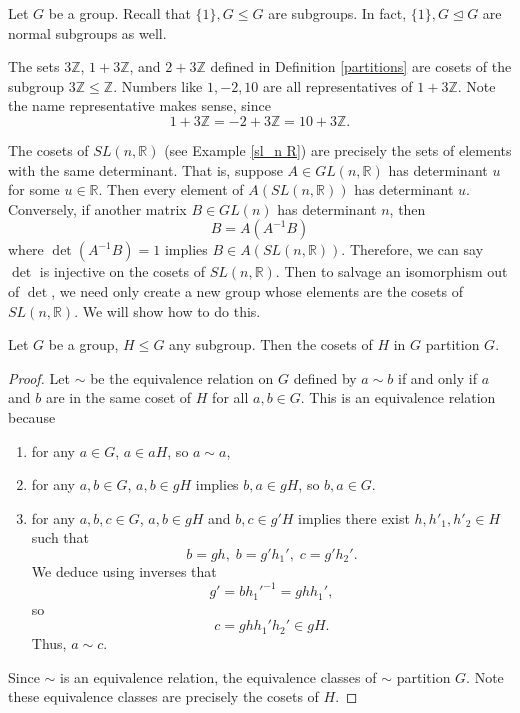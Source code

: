 \documentclass{amsart}
\begin{document}
\begin{example}\label{easy-subgroups-normal}
	Let \(G\) be a group. Recall that \(\{1\}, G\le G\) are subgroups. In fact,
	\(\{1\}, G\trianglelefteq G\) are normal subgroups as well.
\end{example}

\begin{example}\label{3z-normal}
	The sets \(3\mathbb{Z}\), \(1 + 3\mathbb{Z}\), and \(2 + 3\mathbb{Z}\)
	defined in Definition \ref{partitions} are cosets of the subgroup
	\(3\mathbb{Z}\le\mathbb{Z}\). Numbers like \(1, -2, 10\) are all
	representatives of \(1 + 3\mathbb{Z}\). Note the name representative makes
	sense, since
	\[
	   1 + 3\mathbb{Z} = -2 + 3\mathbb{Z} = 10 + 3\mathbb{Z}.
	\]
\end{example}

\begin{example}\label{det-iso}
	The cosets of \(SL(n, \mathbb{R})\) (see Example \ref{sl_n R}) are precisely
	the sets of elements with the same determinant. That is, suppose \(A\in
	GL(n, \mathbb{R})\) has determinant \(u\) for some \(u\in \mathbb{R}\). Then
	every element of \(A(SL(n, \mathbb{R}))\) has determinant \(u\). Conversely,
	if another matrix \(B\in GL(n)\) has determinant \(n\), then 
	\[
	   B = A(A^{-1}B)
	\]
	where \(\det(A^{-1}B) = 1\) implies \(B\in A(SL(n, \mathbb{R}))\).
	Therefore, we can say \(\det\) is injective on the cosets of \(SL(n,
	\mathbb{R})\). Then to salvage an isomorphism out of \(\det\), we need only
	create a new group whose elements are the cosets of \(SL(n, \mathbb{R})\).
	We will show how to do this.
\end{example}

\begin{proposition}\label{cosets-partition}
  Let \(G\) be a group, \(H\le G\) any subgroup. Then the cosets of \(H\) in
  \(G\) partition \(G\). 
\end{proposition}
\begin{proof}
   Let \(\sim\) be the equivalence relation on \(G\) defined by \(a\sim b\) if
	and only if \(a\) and \(b\) are in the same coset of \(H\) for all \(a, b\in
	G\). This is an equivalence relation because 
	\begin{enumerate}[label=(\roman*)]
		\item for any \(a\in G\), \(a\in aH\), so \(a\sim a\),
		\item for any \(a, b\in G\), \(a, b\in gH\) implies \(b, a\in gH\), so
		\(b, a\in G\).
		\item for any \(a, b, c\in G\), \(a, b\in gH\) and \(b, c\in g'H\)
		implies there exist \(h, h'_1, h'_2\in H\) such that 
		\[
		  b = gh, \; b = g'h_1', \; c = g'h_2'.
		\]
		We deduce using inverses that 
		\[
			g' = bh_1'^{-1} = ghh_1',
		\]
		so 
		\[
		   c = ghh_1'h_2'\in gH.
		\]
		Thus, \(a\sim c\).
	\end{enumerate}
	Since \(\sim\) is an equivalence relation, the equivalence classes of
	\(\sim\) partition \(G\). Note these equivalence classes are precisely the
	cosets of \(H\).
\end{proof}
\end{document}
